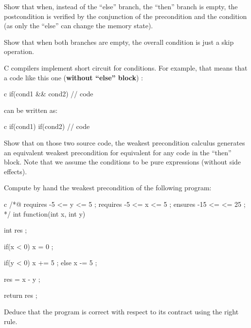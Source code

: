 Show that when, instead of the ``else'' branch, the ``then'' branch is empty,
the postcondition is verified by the conjunction of the precondition and
the condition (as only the ``else'' can change the memory state).

Show that when both branches are empty, the overall condition is just a
skip operation.




C compilers implement short circuit for conditions. For example, that
means that a code like this one (\textbf{without ``else'' block}) :


\begin{CodeBlock}{c}
if(cond1 && cond2){
  // code
}
\end{CodeBlock}



can be written as:



\begin{CodeBlock}{c}
if(cond1){
  if(cond2){
    // code
  }
}
\end{CodeBlock}



Show that on those two source code, the weakest precondition calculus
generates an equivalent weakest precondition for equivalent for any code
in the ``then'' block. Note that we assume the conditions to be pure
expressions (without side effects).





Compute by hand the weakest precondition of the following program:


\begin{CodeBlock}{c}
/*@
  requires -5 <= y <= 5 ;
  requires -5 <= x <= 5 ;
  ensures  -15 <= \result <= 25 ;
*/
int function(int x, int y){
  int res ;

  if(x < 0){
    x = 0 ;
  }

  if(y < 0){
    x += 5 ;
  } else {
    x -= 5 ;
  }

  res = x - y ;

  return res ;
}
\end{CodeBlock}


Deduce that the program is correct with respect to its contract using the
right rule.
